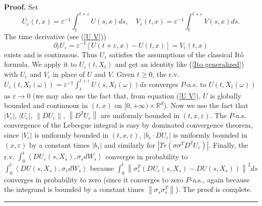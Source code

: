 \documentclass[a4paper,11pt]{article}
\newenvironment{proof}[1][Proof]{\textbf{#1.} }{\ \rule{0.5em}{0.5em}}
\begin{document}
\begin{proof}
Set
\begin{equation*}
U_{\varepsilon }\left( t,x\right) =\varepsilon ^{-1}\int_{t}^{t+\varepsilon
}U\left( s,x\right) ds,\quad V_{\varepsilon }\left( t,x\right) =\varepsilon
^{-1}\int_{t}^{t+\varepsilon }V\left( s,x\right) ds.
\end{equation*}
The time derivative (see (\ref{U V}))
\begin{equation*}
\partial _{t}U_{\varepsilon }=\varepsilon ^{-1}\left[ U\left( t+\varepsilon
,x\right) -U\left( t,x\right) \right] =V_{\varepsilon }\left( t,x\right)
\end{equation*}
exists and is continuous. Thus $U_{\varepsilon }$ satisfies the assumptions
of the classical It\^{o} formula. We apply it to $U_{\varepsilon }\left(
t,X_{t}\right) $ and get an identity like (\ref{Ito generalized}) with $%
U_{\varepsilon }$ and $V_{\varepsilon }$ in place of $U$ and $V$. Given $%
t\geq 0$, the r.v. $U_{\varepsilon }\left( t,X_{t}\left( \omega \right)
\right) =\varepsilon ^{-1}\int_{t}^{t+\varepsilon }U\left( s,X_{t}\left(
\omega \right) \right) ds$ converges $P$-a.s. to $U\left( t,X_{t}\left(
\omega \right) \right) $ as $\varepsilon \rightarrow 0$ (we may also use the
fact that, from equation (\ref{U V}), $U$ is globally bounded and continuous
in $(t,x)$ on $[0,+\infty )\times \mathbb{R}^{d}$). Now we use the fact that
$\left| V_{\varepsilon }\right| $, $\left| U_{\varepsilon }\right| $, $%
\left\| DU_{\varepsilon }\right\| $, $\left\| D^{2}U_{\varepsilon }\right\| $
are uniformly bounded in $\left( t,x,\varepsilon \right) $. The $P$-a.s.
convergence of the Lebesgue integral is easy by dominated convergence
theorem, since $\left| V_{\varepsilon }\right| $ is uniformly bounded in $%
\left( t,x,\varepsilon \right) $, $\left| b_{s}\cdot DU_{\varepsilon
}\right| $ is uniformly bounded in $\left( x,\varepsilon \right) $ by a
constant times $\left| b_{s}\right| $ and similarly for $\left| Tr\left(
\sigma \sigma ^{T}D^{2}U_{\varepsilon }\right) \right| $. Finally, the r.v. $%
\int_{0}^{t}\left\langle DU_{\varepsilon }\left( s,X_{s}\right) ,\sigma
_{s}dW_{s}\right\rangle $ converges in probability to $\int_{0}^{t}\left%
\langle DU\left( s,X_{s}\right) ,\sigma _{s}dW_{s}\right\rangle $ because $%
\int_{0}^{t}\left\| \sigma _{s}^{T}\left( DU_{\varepsilon }\left(
s,X_{s}\right) -DU\left( s,X_{s}\right) \right) \right\| ^{2}ds$ converges
in probability to zero (since it converges to zero $P$-a.s., again because
the integrand is bounded by a constant times $\left\| \sigma _{s}\sigma
_{s}^{T}\right\| $). The proof is complete.
\end{proof}
\end{document}
